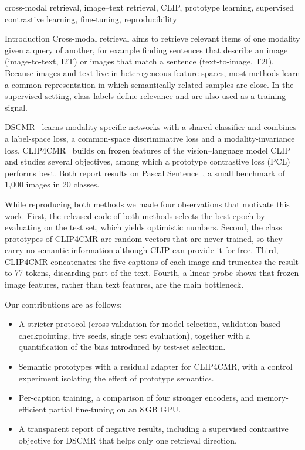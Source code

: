 \documentclass[conference]{IEEEtran}
\makeatletter
\def\section{\@startsection{section}{1}{\z@}{2.2ex plus 1ex minus .5ex}{1ex plus .3ex}%
  {\normalfont\fontsize{12}{14}\selectfont\bfseries\scshape\centering}}
\makeatother
\begin{document}
\begin{IEEEkeywords}
cross-modal retrieval, image--text retrieval, CLIP, prototype learning, supervised contrastive learning, fine-tuning, reproducibility
\end{IEEEkeywords}

\section{Introduction}
Cross-modal retrieval aims to retrieve relevant items of one modality given a query of another, for example finding sentences that describe an image (image-to-text, I2T) or images that match a sentence (text-to-image, T2I). Because images and text live in heterogeneous feature spaces, most methods learn a common representation in which semantically related samples are close. In the supervised setting, class labels define relevance and are also used as a training signal.

DSCMR~\cite{dscmr} learns modality-specific networks with a shared classifier and combines a label-space loss, a common-space discriminative loss and a modality-invariance loss. CLIP4CMR~\cite{clip4cmr} builds on frozen features of the vision--language model CLIP~\cite{clip} and studies several objectives, among which a prototype contrastive loss (PCL) performs best. Both report results on Pascal Sentence~\cite{pascal}, a small benchmark of 1,000 images in 20 classes.

While reproducing both methods we made four observations that motivate this work. First, the released code of both methods selects the best epoch by evaluating on the test set, which yields optimistic numbers. Second, the class prototypes of CLIP4CMR are random vectors that are never trained, so they carry no semantic information although CLIP can provide it for free. Third, CLIP4CMR concatenates the five captions of each image and truncates the result to 77 tokens, discarding part of the text. Fourth, a linear probe shows that frozen image features, rather than text features, are the main bottleneck.

Our contributions are as follows:
\begin{itemize}
\item A stricter protocol (cross-validation for model selection, validation-based checkpointing, five seeds, single test evaluation), together with a quantification of the bias introduced by test-set selection.
\item Semantic prototypes with a residual adapter for CLIP4CMR, with a control experiment isolating the effect of prototype semantics.
\item Per-caption training, a comparison of four stronger encoders, and memory-efficient partial fine-tuning on an 8\,GB GPU.
\item A transparent report of negative results, including a supervised contrastive objective for DSCMR that helps only one retrieval direction.
\end{itemize}
\end{document}
